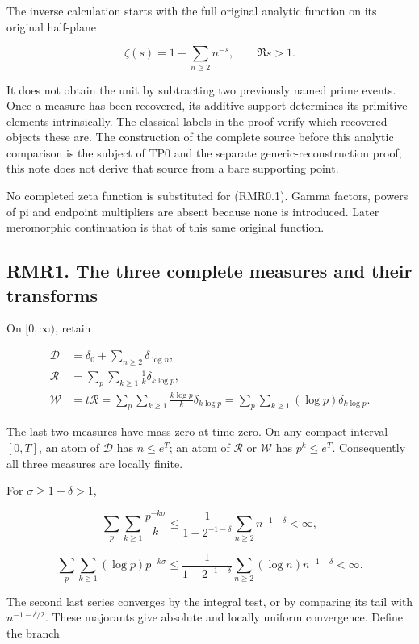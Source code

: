 The inverse calculation starts with the full original analytic function
on its original half-plane

\[
\zeta(s)=1+\sum_{n\ge2}n^{-s},\qquad \Re s>1.
\tag{RMR0.1}
\]

It does not obtain the unit by subtracting two previously named prime
events. Once a measure has been recovered, its additive support
determines its primitive elements intrinsically. The classical labels in
the proof verify which recovered objects these are. The construction of
the complete source before this analytic comparison is the subject of
TP0 and the separate generic-reconstruction proof; this note does not
derive that source from a bare supporting point.

No completed zeta function is substituted for (RMR0.1). Gamma factors,
powers of pi and endpoint multipliers are absent because none is
introduced. Later meromorphic continuation is that of this same original
function.

\subsection{RMR1. The three complete measures and their
transforms}\label{rmr1.-the-three-complete-measures-and-their-transforms}

On \([0,\infty)\), retain

\[
\begin{aligned}
\mathcal D&=\delta_0+\sum_{n\ge2}\delta_{\log n},\\
\mathcal R&=\sum_p\sum_{k\ge1}\frac1k\delta_{k\log p},\\
\mathcal W&=t\mathcal R
=\sum_p\sum_{k\ge1}\frac{k\log p}{k}\delta_{k\log p}
=\sum_p\sum_{k\ge1}(\log p)\delta_{k\log p}.
\end{aligned}
\tag{RMR1.1}
\]

The last two measures have mass zero at time zero. On any compact
interval \([0,T]\), an atom of \(\mathcal D\) has \(n\le e^T\); an atom
of \(\mathcal R\) or \(\mathcal W\) has \(p^k\le e^T\). Consequently all
three measures are locally finite.

For \(\sigma\ge1+\delta>1\),

\[
\sum_p\sum_{k\ge1}\frac{p^{-k\sigma}}k
\le \frac{1}{1-2^{-1-\delta}}\sum_{n\ge2}n^{-1-\delta}<\infty,
\]

\[
\sum_p\sum_{k\ge1}(\log p)p^{-k\sigma}
\le \frac{1}{1-2^{-1-\delta}}
\sum_{n\ge2}(\log n)n^{-1-\delta}<\infty.
\tag{RMR1.2}
\]

The second last series converges by the integral test, or by comparing
its tail with \(n^{-1-\delta/2}\). These majorants give absolute and
locally uniform convergence. Define the branch

